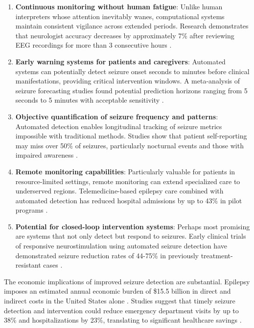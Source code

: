 \documentclass[pdflatex,sn-mathphys-num]{sn-jnl}%
\theoremstyle{thmstyleone}%
\theoremstyle{thmstyletwo}%
\theoremstyle{thmstylethree}%
\begin{document}
\begin{enumerate}
    \item \textbf{Continuous monitoring without human fatigue}: Unlike human interpreters whose attention inevitably wanes, computational systems maintain consistent vigilance across extended periods. Research demonstrates that neurologist accuracy decreases by approximately 7\% after reviewing EEG recordings for more than 3 consecutive hours \citep{Benbadis2009}.
    \item \textbf{Early warning systems for patients and caregivers}: Automated systems can potentially detect seizure onset seconds to minutes before clinical manifestations, providing critical intervention windows. A meta-analysis of seizure forecasting studies found potential prediction horizons ranging from 5 seconds to 5 minutes with acceptable sensitivity \citep{Kuhlmann2018}.
    \item \textbf{Objective quantification of seizure frequency and patterns}: Automated detection enables longitudinal tracking of seizure metrics impossible with traditional methods. Studies show that patient self-reporting may miss over 50\% of seizures, particularly nocturnal events and those with impaired awareness \citep{Blachut2017}.
    \item \textbf{Remote monitoring capabilities}: Particularly valuable for patients in resource-limited settings, remote monitoring can extend specialized care to underserved regions. Telemedicine-based epilepsy care combined with automated detection has reduced hospital admissions by up to 43\% in pilot programs \citep{SanchezAlvarez2018}.
    \item \textbf{Potential for closed-loop intervention systems}: Perhaps most promising are systems that not only detect but respond to seizures. Early clinical trials of responsive neurostimulation using automated seizure detection have demonstrated seizure reduction rates of 44-75\% in previously treatment-resistant cases \citep{Nair2020}.
\end{enumerate}


The economic implications of improved seizure detection are substantial. Epilepsy imposes an estimated annual economic burden of \$15.5 billion in direct and indirect costs in the United States alone \citep{Begley2015}. Studies suggest that timely seizure detection and intervention could reduce emergency department visits by up to 38\% and hospitalizations by 23\%, translating to significant healthcare savings \citep{Jory2019}.
\end{document}
